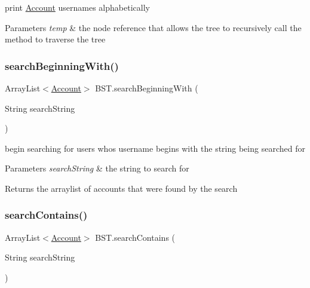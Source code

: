 print \hyperlink{class_account}{Account} usernames alphabetically 


\begin{DoxyParams}{Parameters}
{\em temp} & the node reference that allows the tree to recursively call the method to traverse the tree \\
\hline
\end{DoxyParams}
\mbox{\label{class_b_s_t_a6e9512f119e63d6179adeb1cbe53e668}} 
\subsubsection{\texorpdfstring{search\+Beginning\+With()}{searchBeginningWith()}}
{\footnotesize\ttfamily Array\+List$<$\hyperlink{class_account}{Account}$>$ B\+S\+T.\+search\+Beginning\+With (\begin{DoxyParamCaption}\item[{String}]{search\+String }\end{DoxyParamCaption})}



begin searching for users who\textquotesingle{}s username begins with the string being searched for 


\begin{DoxyParams}{Parameters}
{\em search\+String} & the string to search for \\
\hline
\end{DoxyParams}
\begin{DoxyReturn}{Returns}
the arraylist of accounts that were found by the search 
\end{DoxyReturn}
\mbox{\label{class_b_s_t_a540417596be03377db2b2e86bfa29187}} 
\subsubsection{\texorpdfstring{search\+Contains()}{searchContains()}}
{\footnotesize\ttfamily Array\+List$<$\hyperlink{class_account}{Account}$>$ B\+S\+T.\+search\+Contains (\begin{DoxyParamCaption}\item[{String}]{search\+String }\end{DoxyParamCaption})}



